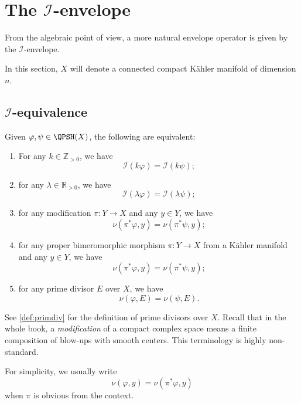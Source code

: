 \section{The \texorpdfstring{$\mathcal{I}$}{I}-envelope}\label{sec:Ienv}
From the algebraic point of view, a more natural envelope operator is given by the $\mathcal{I}$-envelope.

In this section, $X$ will denote a connected compact Kähler manifold of dimension $n$.


\subsection{\texorpdfstring{$\mathcal{I}$}{I}-equivalence}
\label{subsec:Iequiv}

\begin{proposition}\label{prop:Iequivchar}
    Given $\varphi,\psi\in \QPSH(X)$, the following are equivalent:
    \begin{enumerate}
        \item\label{itm:prop:Iequivchar:1} For any $k\in \mathbb{Z}_{>0}$, we have
        \[
            \mathcal{I}(k\varphi)=\mathcal{I}(k\psi);
        \]
        \item\label{itm:prop:Iequivchar:2} for any $\lambda\in \mathbb{R}_{>0}$, we have
            \[
            \mathcal{I}(\lambda\varphi)=\mathcal{I}(\lambda\psi);
            \]
        \item\label{itm:prop:Iequivchar:3} for any modification $\pi\colon Y\rightarrow X$ and any $y\in Y$, we have
            \[
                \nu(\pi^*\varphi,y)=\nu(\pi^*\psi,y);
            \]
        \item\label{itm:prop:Iequivchar:4} for any proper bimeromorphic morphism $\pi\colon Y\rightarrow X$ from a Kähler manifold and any $y\in Y$, we have
            \[
                \nu(\pi^*\varphi,y)=\nu(\pi^*\psi,y);
            \]
        \item\label{itm:prop:Iequivchar:5} for any prime divisor $E$ over $X$, we have
            \[
                \nu(\varphi,E)=\nu(\psi,E).
            \]
    \end{enumerate}
\end{proposition}
See \cref{def:primdiv} for the definition of prime divisors over $X$. Recall that in the whole book, a \emph{modification} of a compact complex space means a finite composition of blow-ups with smooth centers. This terminology is highly non-standard.

For simplicity, we usually write
\[
\nu(\varphi,y)=\nu(\pi^*\varphi,y)
\]
when $\pi$ is obvious from the context.

